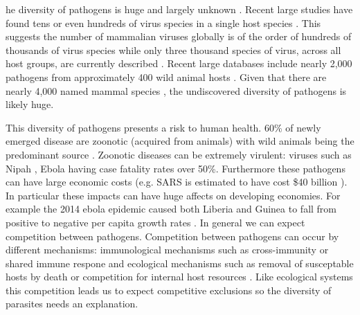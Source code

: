 



he diversity of pathogens is huge and largely unknown \cite{poulin2014parasite}.
Recent large studies have found tens \cite{anthony2013strategy} or even hundreds of virus species in a single host species \cite{anthony2015non}.
This suggests the number of mammalian viruses globally is of the order of hundreds of thousands of virus species \cite{anthony2013strategy} while only three thousand species of virus, across all host groups, are currently described \cite{ICTV}.
Recent large databases include nearly 2,000 pathogens from approximately 400 wild animal hosts \cite{wardeh2015database}.
Given that there are nearly 4,000 named mammal species \cite{wilson2005mammal}, the undiscovered diversity of pathogens is likely huge.


This diversity of pathogens presents a risk to human health.
60\% of newly emerged disease are zoonotic (acquired from animals) with wild animals being the predominant source \cite{jones2008global, woolhouse2006host, taylor2001risk}.
Zoonotic diseases can be extremely virulent: viruses such as Nipah \cite{luby2009recurrent}, Ebola \cite{lefebvre2014case} having case fatality rates over 50\%.
Furthermore these pathogens can have large economic costs (e.g. SARS is estimated to have cost \$40 billion \cite{knobler2004learning}).
In particular these impacts can have huge affects on developing economies.
For example the 2014 ebola epidemic caused both Liberia and Guinea to fall from positive to negative per capita growth rates \cite{ebolaWorldbank, ebola2015worldbank}.
In general we can expect competition between pathogens.
Competition between pathogens can occur by different mechanisms: immunological mechanisms such as cross-immunity or shared immune respone \cite{fenton2010applying} and ecological mechanisms such as removal of susceptable hosts by death \cite{rohani2003ecological} or competition for internal host resources \cite{griffiths2014analysis}.
Like ecological systems this competition leads us to expect competitive exclusions \cite{bremermann1989competitive, martcheva2013competitive, ackleh2003competitive, ackleh2014robust, turner2002impact} so the diversity of parasites needs an explanation.

